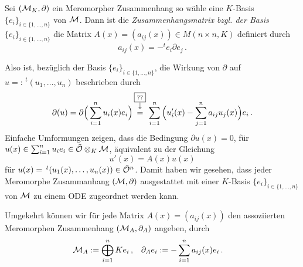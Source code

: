 \begin{defn}[Zusammenhangsmatrix] \cite[Seite 129]{hotta2007d}
Sei $(\mathcal{M}_K,\partial)$ ein Meromorpher Zusammenhang so wähle eine $K$-Basis
$\{e_i\}_{i\in\{1,\dots,n\}}$ von $\mathcal{M}$. Dann ist die
\emph{Zusammenhangsmatrix bzgl. der Basis $\{e_i\}_{i\in\{1,\dots,n\}}$} die
Matrix $A(x)=(a_{ij}(x))\in M(n\times n,K)$ definiert durch
\[ a_{ij}(x) = -^te_i \partial e_j \,. \]
\end{defn}

Also ist, bezüglich der Basis $\{e_i\}_{i\in\{1,\dots,n\}}$, die Wirkung von
$\partial$ auf $u=:\,^t(u_1,\dots,u_n)$ beschrieben durch
\[
\partial(u) = \partial \Big( \sum_{i=1}^nu_i(x)e_i \Big)
\overbox{=}{??}\sum_{i=1}^n \Big( u_i'(x)-
\sum_{j=1}^na_{ij}u_j(x) \Big)e_i \,.
\]
Einfache Umformungen zeigen, dass die Bedingung $\partial u(x)=0$, für
$u(x)\in \sum_{i=1}^n u_ie_i\in \tilde {\mathcal{O}} \otimes_K\mathcal{M}$, äquivalent zu der
Gleichung
\begin{equation*}
u'(x)=A(x)u(x)
\end{equation*}
für $u(x)=\,^t(u_1(x),\dots,u_n(x))\in\tilde {\mathcal{O}}^n$. Damit haben wir gesehen,
dass jeder Meromorphe Zusammanhang $(\mathcal{M},\partial)$ ausgestattet mit einer
$K$-Basis $\{e_i\}_{i\in\{1,\dots,n\}}$ von $\mathcal{M}$ zu einem ODE zugeordnet
werden kann. 

Umgekehrt können wir für jede Matrix $A(x)=(a_{ij}(x))$ den
assoziierten Meromorphen Zusammenhang $(\mathcal{M}_A,\partial_A)$ %
angeben, durch
\begin{align*}
\mathcal{M}_A & :=\bigoplus_{i=1}^n Ke_i \,, & \partial_A e_i &:=
-\sum_{i=1}^na_{ij}(x)e_i \,.
\end{align*}

\begin{comment}
\section{Alternativer Zugang}
Hier wird nun ein alternativer Zugang, wie in \cite[3.1.1]{sabbah_cimpa90}, 
präsentiert. Sei $\cF$ ein Funktionenraum, auf dem die Differentialoperatoren
$\cD$ wirken.

Sei $P$ ein linearer Differentialoperator mit Koeffizienten in $a_i(t)\in\Ckx$
geschrieben als $P=\sum^{d}_{i=0}{a_{i}(t)\partial_t^i}}$.
Man sagt eine Funktion $u\in\cF$ ist Lösung von $P$, falls $u$ die Gleichung
$Pu=0$ erfüllt.
Man sagt $0$ ist ein singulärer Punkt falls $a_d(0)=0$.
Falls $0$ kein singulärer Punkt ist, hat $P$ genau $d$ über $\C$ Unabhängige
Lösungen in $\C\{t\}$. %

Falls $u$ ein Lösung von $P$ ist, so ist $u$ auch Lösung von $Q\cdot P$ mit
$Q\in \cD$. Also hängt die Lösung nur vom Links Ideal $I$ von $\cD$, welches
von $P$ erzeugt wird.
\end{comment}


